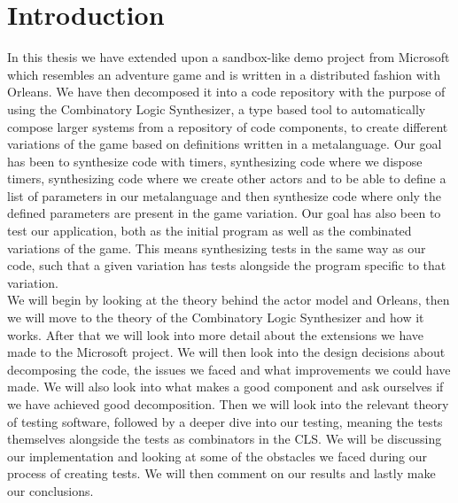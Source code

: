 \section{Introduction}\label{intro}
In this thesis we have extended upon a sandbox-like demo project from Microsoft \cite{AdventureGame} which resembles an adventure game and is written in a distributed fashion with Orleans. We have then decomposed it into a code repository with the  purpose of using the Combinatory Logic Synthesizer, a type based tool to automatically compose larger systems from a repository of code components, to create different variations of the game based on definitions written in a metalanguage. Our goal has been to synthesize code with timers, synthesizing code where we dispose timers, synthesizing code where we create other actors and to be able to define a list of parameters in our metalanguage and then synthesize code where only the defined parameters are present in the game variation. Our goal has also been to test our application, both as the initial program as well as the combinated variations of the game. This means synthesizing tests in the same way as our code, such that a given variation has tests alongside the program specific to that variation. \\
We will begin by looking at the theory behind the actor model and Orleans, then we will move to the theory of the Combinatory Logic Synthesizer and how it works. After that we will look into more detail about the extensions we have made to the Microsoft project. We will then look into the design decisions about decomposing the code, the issues we faced and what improvements we could have made. We will also look into what makes a good component and ask ourselves if we have achieved good decomposition. 
Then we will look into the relevant theory of testing software, followed by a deeper dive into our testing, meaning the tests themselves alongside the tests as combinators in the CLS. We will be discussing our implementation and looking at some of the obstacles we faced during our process of creating tests. We will then comment on our results and lastly make our conclusions.